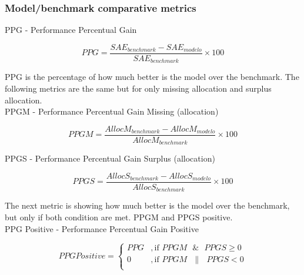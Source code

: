 \subsubsection{Model/benchmark comparative metrics}

PPG - Performance Percentual Gain
\begin{linenomath}
    \begin{equation}\label{eq:PPG}
        PPG = \frac{SAE_{benchmark} - SAE_{modelo}}{SAE_{benchmark}} \times 100
    \end{equation}
    \end{linenomath}
PPG is the percentage of how much better is the model over the benchmark. The following metrics are the same but for only missing allocation and surplus allocation.\\
PPGM - Performance Percentual Gain Missing (allocation)\\
\begin{linenomath}
    \begin{equation}\label{eq:PPGM}
        PPGM = \frac{AllocM_{benchmark} - AllocM_{modelo}}{AllocM_{benchmark}} \times 100
    \end{equation}
    \end{linenomath}
PPGS - Performance Percentual Gain Surplus (allocation)\\
\begin{linenomath}
    \begin{equation}\label{eq:PPGS}
        PPGS = \frac{AllocS_{benchmark} - AllocS_{modelo}}{AllocS_{benchmark}} \times 100
    \end{equation}
    \end{linenomath}

The next metric is showing how much better is the model over the benchmark, but only if both condition are met. PPGM and PPGS positive.\\
PPG Positive  - Performance Percentual Gain Positive
\begin{linenomath}
    \begin{equation}\label{eq:PPGPositive}
        PPG Positive = 
        \begin{cases} 
            PPG & , \text{if } PPGM \text{ }\&\text{ } PPGS \geq 0 \\
            0 & , \text{if } PPGM \text{ }\|\text{ } PPGS < 0 \\
        \end{cases} 
        \end{equation}
    \end{linenomath}
